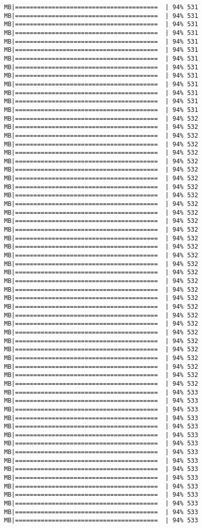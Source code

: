 \documentclass[
]{article}
\begin{document}
\begin{verbatim}
MB|=======================================  | 94% 531 MB|=======================================  | 94% 531 MB|=======================================  | 94% 531 MB|=======================================  | 94% 531 MB|=======================================  | 94% 531 MB|=======================================  | 94% 531 MB|=======================================  | 94% 531 MB|=======================================  | 94% 531 MB|=======================================  | 94% 531 MB|=======================================  | 94% 531 MB|=======================================  | 94% 531 MB|=======================================  | 94% 531 MB|=======================================  | 94% 531 MB|=======================================  | 94% 532 MB|=======================================  | 94% 532 MB|=======================================  | 94% 532 MB|=======================================  | 94% 532 MB|=======================================  | 94% 532 MB|=======================================  | 94% 532 MB|=======================================  | 94% 532 MB|=======================================  | 94% 532 MB|=======================================  | 94% 532 MB|=======================================  | 94% 532 MB|=======================================  | 94% 532 MB|=======================================  | 94% 532 MB|=======================================  | 94% 532 MB|=======================================  | 94% 532 MB|=======================================  | 94% 532 MB|=======================================  | 94% 532 MB|=======================================  | 94% 532 MB|=======================================  | 94% 532 MB|=======================================  | 94% 532 MB|=======================================  | 94% 532 MB|=======================================  | 94% 532 MB|=======================================  | 94% 532 MB|=======================================  | 94% 532 MB|=======================================  | 94% 532 MB|=======================================  | 94% 532 MB|=======================================  | 94% 532 MB|=======================================  | 94% 532 MB|=======================================  | 94% 532 MB|=======================================  | 94% 532 MB|=======================================  | 94% 532 MB|=======================================  | 94% 532 MB|=======================================  | 94% 532 MB|=======================================  | 94% 533 MB|=======================================  | 94% 533 MB|=======================================  | 94% 533 MB|=======================================  | 94% 533 MB|=======================================  | 94% 533 MB|=======================================  | 94% 533 MB|=======================================  | 94% 533 MB|=======================================  | 94% 533 MB|=======================================  | 94% 533 MB|=======================================  | 94% 533 MB|=======================================  | 94% 533 MB|=======================================  | 94% 533 MB|=======================================  | 94% 533 MB|=======================================  | 94% 533 MB|=======================================  | 94% 533 MB|=======================================  | 94% 533 
\end{verbatim}
\end{document}

